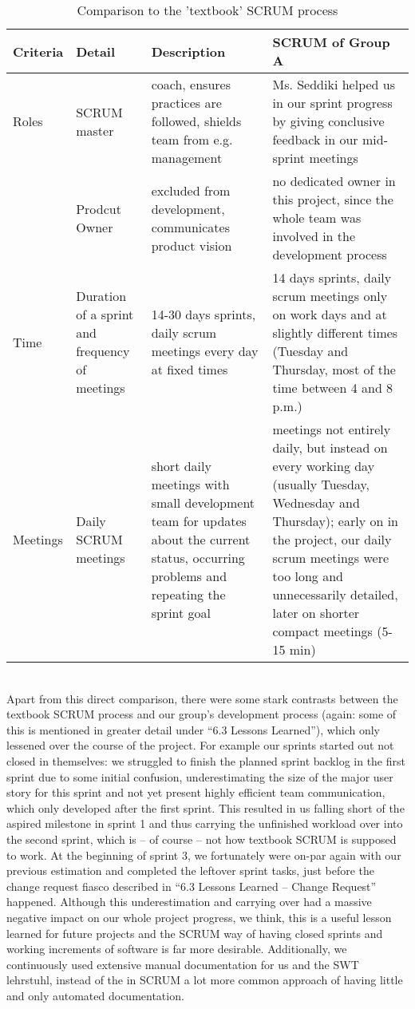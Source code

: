 \begin{table}[!h]
  \caption{Comparison to the 'textbook' SCRUM process}
  \centering
  \begin{tabular}{|p{1.5cm}|p{2cm}|p{4cm}|p{4cm}|}
    Criteria & Detail & Description & SCRUM of Group A\\
    \hline
    \hline
     Roles & SCRUM master & coach, ensures practices are followed, shields team from e.g. management & Ms. Seddiki helped us in our sprint progress by giving conclusive feedback in our mid-sprint meetings \\
    \hline
       & Prodcut Owner & excluded from development, communicates product vision & no dedicated owner in this project, since the whole team was involved in the development process \\
    \hline
    Time & Duration of a sprint and frequency of meetings & 14-30 days sprints, daily scrum meetings every day at fixed times & 14 days sprints, daily scrum meetings only on work days and at slightly different times (Tuesday and Thursday, most of the time between 4 and 8 p.m.) \\
    \hline
    Meetings & Daily SCRUM meetings & short daily meetings with small development team for updates about the current status, occurring problems and repeating the sprint goal & meetings not entirely daily, but instead on every working day (usually Tuesday, Wednesday and Thursday); early on in the project, our daily scrum meetings were too long and unnecessarily detailed, later on shorter compact meetings (5-15 min) \\
    \hline
    \hline
  \end{tabular}
\end{table}    
\ \\
Apart from this direct comparison, there were some stark contrasts between the textbook SCRUM process and our group’s development process (again: some of this is mentioned in greater detail under “6.3 Lessons Learned”), which only lessened over the course of the project. For example our sprints started out not closed in themselves: we struggled to finish the planned sprint backlog in the first sprint due to some initial confusion, underestimating the size of the major user story for this sprint and not yet present highly efficient team communication, which only developed after the first sprint. This resulted in us falling short of the aspired milestone in sprint 1 and thus carrying the unfinished workload over into the second sprint, which is – of course – not how textbook SCRUM is supposed to work. At the beginning of sprint 3, we fortunately were on-par again with our previous estimation and completed the leftover sprint tasks, just before the change request fiasco described in “6.3 Lessons Learned – Change Request” happened. Although this underestimation and carrying over had a massive negative impact on our whole project progress, we think, this is a useful lesson learned for future projects and the SCRUM way of having closed sprints and working increments of software is far more desirable. Additionally, we continuously used extensive manual documentation for us and the SWT lehrstuhl, instead of the in SCRUM a lot more common approach of having little and only automated documentation.\\
